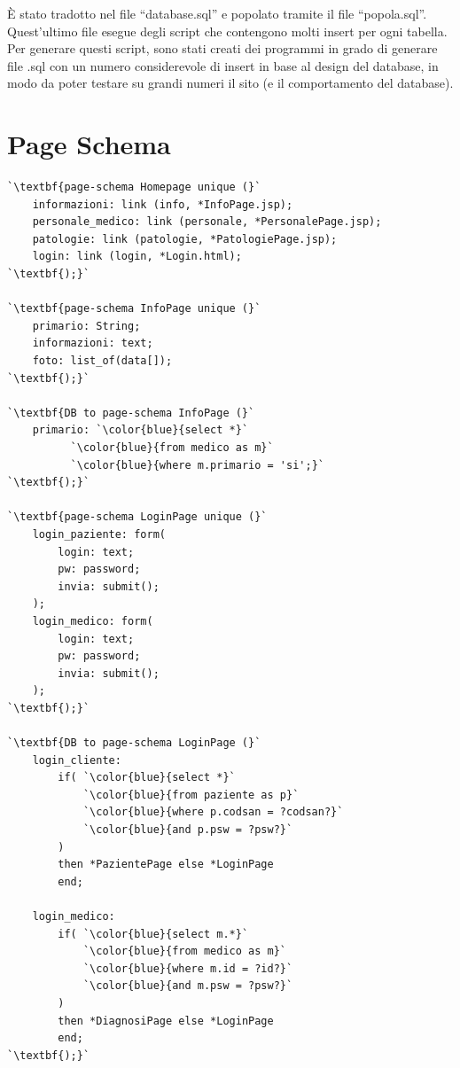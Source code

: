 \documentclass[a4paper,titlepage]{article}
\begin{document}
È stato tradotto nel file ``database.sql'' e popolato tramite il file ``popola.sql''. Quest'ultimo file esegue degli script che contengono molti insert per ogni tabella.
Per generare questi script, sono stati creati dei programmi in grado di generare file .sql con un numero considerevole di insert in base al design del database, in modo da poter testare su grandi numeri il sito (e il comportamento del database).

\newpage
\part{Page Schema}

\begin{lstlisting}
`\textbf{page-schema Homepage unique (}`
	informazioni: link (info, *InfoPage.jsp);
	personale_medico: link (personale, *PersonalePage.jsp);
	patologie: link (patologie, *PatologiePage.jsp);
	login: link (login, *Login.html);
`\textbf{);}`

`\textbf{page-schema InfoPage unique (}`
	primario: String;
	informazioni: text;
	foto: list_of(data[]);
`\textbf{);}`

`\textbf{DB to page-schema InfoPage (}`
	primario: `\color{blue}{select *}` 
		  `\color{blue}{from medico as m}`
		  `\color{blue}{where m.primario = 'si';}`
`\textbf{);}`

`\textbf{page-schema LoginPage unique (}`
	login_paziente: form(
		login: text;
		pw: password;
		invia: submit();
	);
	login_medico: form(
		login: text;
		pw: password;
		invia: submit();
	);
`\textbf{);}`

`\textbf{DB to page-schema LoginPage (}`
	login_cliente:
		if(	`\color{blue}{select *}`
			`\color{blue}{from paziente as p}`
			`\color{blue}{where p.codsan = ?codsan?}`
			`\color{blue}{and p.psw = ?psw?}`
		)
		then *PazientePage else *LoginPage
		end;

	login_medico:
		if(	`\color{blue}{select m.*}`
			`\color{blue}{from medico as m}`
			`\color{blue}{where m.id = ?id?}`
			`\color{blue}{and m.psw = ?psw?}`
		)
		then *DiagnosiPage else *LoginPage
		end;
`\textbf{);}`
\end{lstlisting}
\newpage
\end{document}
